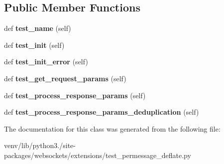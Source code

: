 \subsection*{Public Member Functions}
\begin{DoxyCompactItemize}
\item 
\mbox{\label{classwebsockets_1_1extensions_1_1test__permessage__deflate_1_1_client_per_message_deflate_factory_tests_a9ebc18db027605fde0db3381145e318f}} 
def {\bfseries test\+\_\+name} (self)
\item 
\mbox{\label{classwebsockets_1_1extensions_1_1test__permessage__deflate_1_1_client_per_message_deflate_factory_tests_a8d14035dee3405e543857a6a99bbbff4}} 
def {\bfseries test\+\_\+init} (self)
\item 
\mbox{\label{classwebsockets_1_1extensions_1_1test__permessage__deflate_1_1_client_per_message_deflate_factory_tests_a52ba3e7c44b0ab057ec00bfd7482565d}} 
def {\bfseries test\+\_\+init\+\_\+error} (self)
\item 
\mbox{\label{classwebsockets_1_1extensions_1_1test__permessage__deflate_1_1_client_per_message_deflate_factory_tests_a9ef93d9a0a9d579c1d4e53ca2be9728d}} 
def {\bfseries test\+\_\+get\+\_\+request\+\_\+params} (self)
\item 
\mbox{\label{classwebsockets_1_1extensions_1_1test__permessage__deflate_1_1_client_per_message_deflate_factory_tests_a76e10cf383df826b84147ec6f5363def}} 
def {\bfseries test\+\_\+process\+\_\+response\+\_\+params} (self)
\item 
\mbox{\label{classwebsockets_1_1extensions_1_1test__permessage__deflate_1_1_client_per_message_deflate_factory_tests_a15dbff6738d442bc6f897a9f2bee9734}} 
def {\bfseries test\+\_\+process\+\_\+response\+\_\+params\+\_\+deduplication} (self)
\end{DoxyCompactItemize}


The documentation for this class was generated from the following file\+:\begin{DoxyCompactItemize}
\item 
venv/lib/python3./site-\/packages/websockets/extensions/test\+\_\+permessage\+\_\+deflate.\+py\end{DoxyCompactItemize}
